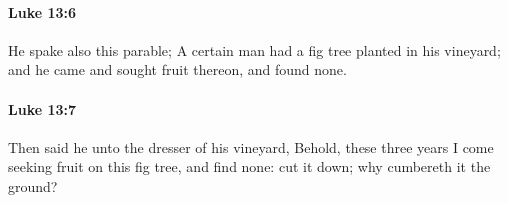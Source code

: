 		\paragraph{Luke 13:6} %
			\label{LUKE-13-6}

			He spake also this parable; A certain man had a fig tree planted in his vineyard; and he came and sought fruit thereon, and found none.

			\begin{framed}
			\scriptsize
				\begin{compactdesc}
					\item[SBLG] 
				\end{compactdesc}
			\end{framed}

		\paragraph{Luke 13:7} %
			\label{LUKE-13-7}

			Then said he unto the dresser of his vineyard, Behold, these three years I come seeking fruit on this fig tree, and find none: cut it down; why cumbereth it the ground?

